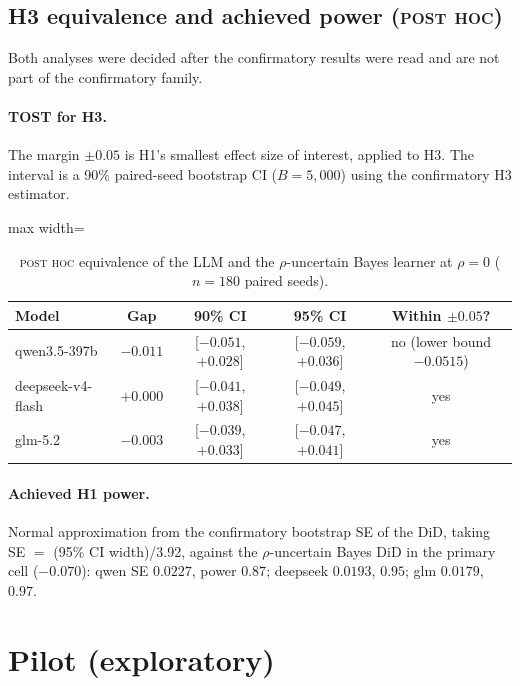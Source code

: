 \documentclass[11pt,letterpaper]{article}
\newcommand{\did}{\mathrm{DiD}}
\newcommand{\posthoc}{\textsc{post hoc}}
\numberwithin{equation}{section}
\numberwithin{table}{section}
\numberwithin{figure}{section}
\numberwithin{algorithm}{section}
\begin{document}
\subsection{H3 equivalence and achieved power (\posthoc)}

Both analyses were decided after the confirmatory results were read and are not part of the confirmatory family.

\paragraph{TOST for H3.} The margin $\pm0.05$ is H1's smallest effect size of interest, applied to H3. The interval is a 90\% paired-seed bootstrap CI ($B=5{,}000$) using the confirmatory H3 estimator.

\begin{table}[h]
\centering\small
\caption{\posthoc{} equivalence of the LLM and the $\rho$-uncertain Bayes learner at $\rho=0$ ($n=180$ paired seeds).}
\label{tab:tost}
\begin{adjustbox}{max width=\linewidth}
\begin{tabular}{lcccc}
\toprule
Model & Gap & 90\% CI & 95\% CI & Within $\pm0.05$? \\
\midrule
qwen3.5-397b & $-0.011$ & [$-0.051$, $+0.028$] & [$-0.059$, $+0.036$] & no (lower bound $-0.0515$) \\
deepseek-v4-flash & $+0.000$ & [$-0.041$, $+0.038$] & [$-0.049$, $+0.045$] & yes \\
glm-5.2 & $-0.003$ & [$-0.039$, $+0.033$] & [$-0.047$, $+0.041$] & yes \\
\bottomrule
\end{tabular}
\end{adjustbox}
\end{table}

\paragraph{Achieved H1 power.} Normal approximation from the confirmatory bootstrap SE of the $\did$, taking SE $=$ (95\% CI width)/3.92, against the $\rho$-uncertain Bayes $\did$ in the primary cell ($-0.070$): qwen SE $0.0227$, power $0.87$; deepseek $0.0193$, $0.95$; glm $0.0179$, $0.97$.

\section{Pilot (exploratory)}\label{app:pilot}
\end{document}
